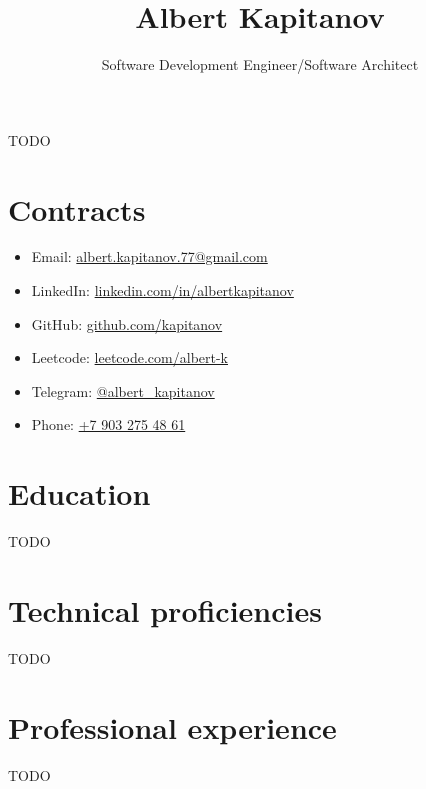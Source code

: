 \documentclass{article}
\title{Albert Kapitanov}
\author{Software Development Engineer/Software Architect}
\date{}
\begin{document}
\maketitle

\section*{}

TODO

\section*{Contracts}

\begin{itemize}
  \item Email: \href{mailto:albert.kapitanov.77@gmail.com}{albert.kapitanov.77@gmail.com}
  \item LinkedIn: \href{https://www.linkedin.com/in/albertkapitanov}{linkedin.com/in/albertkapitanov}
  \item GitHub: \href{https://github.com/kapitanov}{github.com/kapitanov}
  \item Leetcode: \href{https://leetcode.com/albert-k}{leetcode.com/albert-k}
  \item Telegram: \href{https://t.me/albert_kapitanov}{@albert\_kapitanov}
  \item Phone: \href{tel:+79032754861}{+7 903 275 48 61}
\end{itemize}

\section*{Education}

TODO

\section*{Technical proficiencies}

TODO

\section*{Professional experience}

TODO
\end{document}

